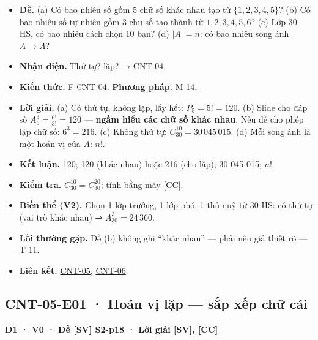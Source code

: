 \documentclass[
  10pt,
  twoside,openany]{book}
\providecommand{\tightlist}{%
  \setlength{\itemsep}{0pt}\setlength{\parskip}{0pt}}
\begin{document}
\begin{itemize}
\tightlist
\item
  \textbf{Đề.} (a) Có bao nhiêu số gồm 5 chữ số khác nhau tạo từ
  \(\{1,2,3,4,5\}\)? (b) Có bao nhiêu số tự nhiên gồm 3 chữ số tạo thành
  từ \(1,2,3,4,5,6\)? (c) Lớp 30 HS, có bao nhiêu cách chọn 10 bạn? (d)
  \(|A|=n\): có bao nhiêu song ánh \(A\to A\)?
\item
  \textbf{Nhận diện.} Thứ tự? lặp? → \protect\hyperlink{CNT-04}{CNT-04}.
\item
  \textbf{Kiến thức.} \protect\hyperlink{F-CNT-04}{F-CNT-04}.
  \textbf{Phương pháp.} \protect\hyperlink{M-14}{M-14}.
\item
  \textbf{Lời giải.} (a) Có thứ tự, không lặp, lấy hết: \(P_5=5!=120\).
  (b) Slide cho đáp số \(A_6^3=\frac{6!}{3!}=120\) --- \textbf{ngầm hiểu
  các chữ số khác nhau}. Nếu đề cho phép lặp chữ số: \(6^3=216\). (c)
  Không thứ tự: \(C_{30}^{10}=30\,045\,015\). (d) Mỗi song ánh là một
  hoán vị của \(A\): \(n!\).
\item
  \textbf{Kết luận.} 120; 120 (khác nhau) hoặc 216 (cho lặp); 30 045
  015; \(n!\).
\item
  \textbf{Kiểm tra.} \(C_{30}^{10}=C_{30}^{20}\); tính bằng máy
  {[}CC{]}.
\item
  \textbf{Biến thể (V2).} Chọn 1 lớp trưởng, 1 lớp phó, 1 thủ quỹ từ 30
  HS: có thứ tự (vai trò khác nhau) ⇒ \(A_{30}^3=24\,360\).
\item
  \textbf{Lỗi thường gặp.} Đề (b) không ghi ``khác nhau'' --- phải nêu
  giả thiết rõ --- \protect\hyperlink{T-11}{T-11}.
\item
  \textbf{Liên kết.} \protect\hyperlink{CNT-05}{CNT-05},
  \protect\hyperlink{CNT-06}{CNT-06}.
\end{itemize}

\hypertarget{CNT-05-E01}{%
\subsection{CNT-05-E01 · Hoán vị lặp --- sắp xếp chữ
cái}\label{CNT-05-E01}}

\textbf{D1 · V0 · Đề {[}SV{]} S2-p18 · Lời giải {[}SV{]}, {[}CC{]}}
\end{document}
